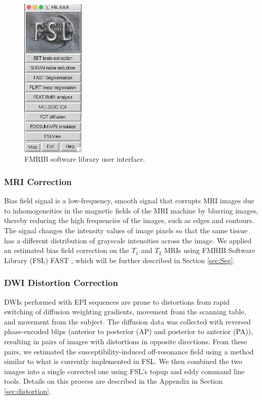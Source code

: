 \begin{figure}
    \centering
    \vspace{-63pt}
    \includegraphics[width=3cm]{Figures/FSL}
    \caption{FMRIB software library user interface.}
    \label{fig:fsl}
\end{figure}

\subsubsection{MRI Correction}

Bias field signal is a low-frequency, smooth signal that corrupts MRI images due to inhomogeneities in the magnetic fields of the MRI machine by blurring images, thereby reducing the high frequencies of the images, such as edges and contours. The signal changes the intensity values of image pixels so that the same tissue has a different distribution of grayscale intensities across the image. \cite{ref:bias} We applied an estimated bias field correction on the $T_1$ and $T_2$ MRIs using FMRIB Software Library (FSL) FAST \cite{ref:fslfast}, which will be further described in Section \ref{sec:Seg}.

\subsubsection{DWI Distortion Correction}

DWIs performed with EPI sequences are prone to distortions from rapid switching of diffusion weighting gradients, movement from the scanning table, and movement from the subject. The diffusion data was collected with reversed phase-encoded blips (anterior to posterior (AP) and posterior to anterior (PA)), resulting in pairs of images with distortions in opposite directions. From these pairs, we estimated the susceptibility-induced off-resonance field using a method \cite{ref:fsltopup1} similar to what is currently implemented in FSL.\cite{ref:fsltopup2} We then combined the two images into a single corrected one using FSL's topup and eddy command line tools. Details on this process are described in the Appendix in Section \ref{sec:distortion}.

